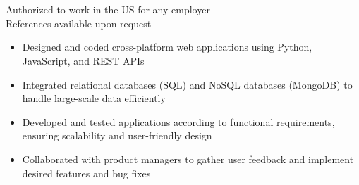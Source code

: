 {\begin{minipage}[t]{13.5cm}
\begin{minipage}[t]{6.5cm}
      \hfill{}\\
      \hfill{}\\
      \hfill{}\\
      \hfill{}\\
      \par\medskip
      \hfill{}\\
      \hfill{}\\
      \hfill{}\\
    \end{minipage}
    \par\bigskip
    \par\bigskip
    \begin{minipage}{13.5cm}
      \begin{center}
        Authorized to work in the US for any employer\\
        References available upon request
      \end{center}
    \end{minipage}
  \end{minipage}
}
\makecvheader

\par\bigskip
{}
\par\smallskip
\begin{minipage}{13.75cm}
  \begin{minipage}{6.5cm}
    \begin{itemize}
      \item Designed and coded cross-platform web applications using Python, JavaScript, and REST APIs
      \item Integrated relational databases (SQL) and NoSQL databases (MongoDB) to handle large-scale data efficiently
    \end{itemize}
  \end{minipage}
  \hfill
  \begin{minipage}{6.5cm}
    \begin{itemize}
      \item Developed and tested applications according to functional requirements, ensuring scalability and user-friendly design
      \item Collaborated with product managers to gather user feedback and implement desired features and bug fixes
    \end{itemize}
  \end{minipage}
\end{minipage}
\par\smallskip
\divider

